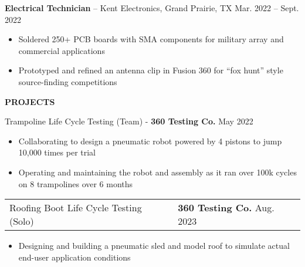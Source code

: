 \documentclass[18pt]{article}
\begin{document}
\vspace{-0.5\baselineskip}
\textbf{Electrical Technician} – Kent Electronics, Grand Prairie, TX \hfill Mar. 2022 – Sept. 2022

\begin{itemize}[noitemsep]
    \vspace{-0.75\baselineskip}
    \item Soldered 250+ PCB boards with SMA components for military array and commercial applications
    \item Prototyped and refined an antenna clip in Fusion 360 for “fox hunt” style source-finding competitions 
\end{itemize}



\vspace{-1.25\baselineskip}
\begin{center}
    \textbf{PROJECTS}
    \hrulefill
\end{center}
\vspace{-0.5\baselineskip}

\hspace{0.25in} Trampoline Life Cycle Testing (Team) - \textbf{360 Testing Co.} \hfill May 2022

\begin{itemize}[noitemsep]
    \vspace{-0.75\baselineskip}
    \item Collaborating to design a pneumatic robot powered by 4 pistons to jump 10,000 times per trial
    \item Operating and maintaining the robot and assembly as it ran over 100k cycles on 8 trampolines over 6 months
\end{itemize}

\vspace{-0.5\baselineskip}
\begin{tabular}{p{} p{} }
    Roofing Boot Life Cycle Testing (Solo)
    &
    \textbf{360 Testing Co.}
    \hfill Aug. 2023
\end{tabular}

\begin{itemize}[noitemsep]
    \vspace{-0.75\baselineskip}
    \item Designing and building a pneumatic sled and model roof to simulate actual end-user application conditions 
\end{itemize}
\end{document}
